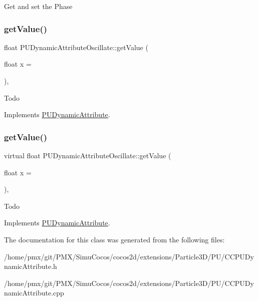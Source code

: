 Get and set the Phase \mbox{\label{classPUDynamicAttributeOscillate_a01b85ebd9d38fa6d0276ae8b98337673}} 
\subsubsection{\texorpdfstring{get\+Value()}{getValue()}\hspace{0.1cm}{\footnotesize\ttfamily [1/2]}}
{\footnotesize\ttfamily float P\+U\+Dynamic\+Attribute\+Oscillate\+::get\+Value (\begin{DoxyParamCaption}\item[{float}]{x = {} }\end{DoxyParamCaption})\hspace{0.3cm}{\ttfamily [override]}, {\ttfamily [virtual]}}

Todo 

Implements \hyperlink{classPUDynamicAttribute_ac478ecb2528f32b536b1faa72558c756}{P\+U\+Dynamic\+Attribute}.

\mbox{\label{classPUDynamicAttributeOscillate_aeb4b57af76effcaef69b5a305a7dd8a6}} 
\subsubsection{\texorpdfstring{get\+Value()}{getValue()}\hspace{0.1cm}{\footnotesize\ttfamily [2/2]}}
{\footnotesize\ttfamily virtual float P\+U\+Dynamic\+Attribute\+Oscillate\+::get\+Value (\begin{DoxyParamCaption}\item[{float}]{x = {} }\end{DoxyParamCaption})\hspace{0.3cm}{\ttfamily [override]}, {\ttfamily [virtual]}}

Todo 

Implements \hyperlink{classPUDynamicAttribute_ac478ecb2528f32b536b1faa72558c756}{P\+U\+Dynamic\+Attribute}.



The documentation for this class was generated from the following files\+:\begin{DoxyCompactItemize}
\item 
/home/pmx/git/\+P\+M\+X/\+Simu\+Cocos/cocos2d/extensions/\+Particle3\+D/\+P\+U/C\+C\+P\+U\+Dynamic\+Attribute.\+h\item 
/home/pmx/git/\+P\+M\+X/\+Simu\+Cocos/cocos2d/extensions/\+Particle3\+D/\+P\+U/C\+C\+P\+U\+Dynamic\+Attribute.\+cpp\end{DoxyCompactItemize}
